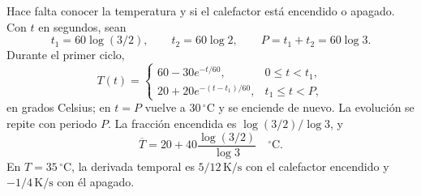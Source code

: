 Hace falta conocer la temperatura y si el calefactor está encendido o apagado. Con \(t\) en segundos, sean
\[
t_1=60\log(3/2),\qquad
t_2=60\log2,\qquad P=t_1+t_2=60\log3.
\]
Durante el primer ciclo,
\[
T(t)=
\begin{cases}
60-30e^{-t/60},&0\le t<t_1,\\
20+20e^{-(t-t_1)/60},&t_1\le t<P,
\end{cases}
\]
en grados Celsius; en \(t=P\) vuelve a \(30\,{}^\circ\mathrm C\) y se enciende de nuevo. La evolución se repite con periodo \(P\). La fracción encendida es \(\log(3/2)/\log3\), y
\[
\overline T=20+40\frac{\log(3/2)}{\log3}\quad{}^\circ\mathrm C.
\]
En \(T=35\,{}^\circ\mathrm C\), la derivada temporal es \(5/12\,\mathrm{K/s}\) con el calefactor encendido y \(-1/4\,\mathrm{K/s}\) con él apagado.
